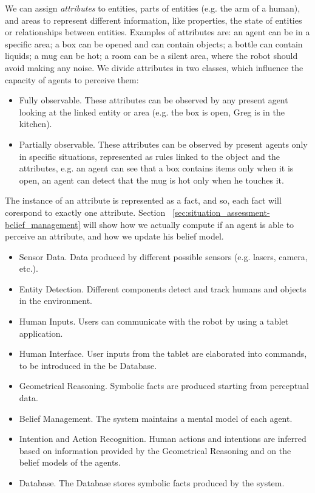 We can assign \textit{attributes} to entities, parts of entities (e.g. the arm of a human), and areas to represent different information, like properties, the state of entities or relationships between entities. Examples of attributes are:
an agent can be in a specific area; a box can be opened and can contain objects; a bottle can contain liquids; a mug can be hot; a room can be a silent area, where the robot should avoid making any noise.
We divide attributes in two classes, which influence the capacity of agents to perceive them: 
\begin{itemize}
\item Fully observable. These attributes can be observed by any present agent looking at the linked entity or area (e.g. the box is open, Greg is in the kitchen).
\item Partially observable. These attributes can be observed by present agents only in specific situations, represented as rules linked to the object and the attributes, e.g. an agent can see that a box contains items only when it is open, an agent can detect that the mug is hot only when he touches it. 
\end{itemize}

The instance of an attribute is represented as a fact, and so, each fact will corespond to exactly one attribute. Section ~\ref{sec:situation_assessment-belief_management} will show how we actually compute if an agent is able to perceive an attribute, and how we update his belief model. 


\begin{itemize}
\item Sensor Data. Data produced by different possible sensors (e.g. lasers, camera, etc.).
\item Entity Detection. Different components detect and track humans and objects in the environment.
\item Human Inputs. Users can communicate with the robot by using a tablet application.
\item Human Interface. User inputs from the tablet are elaborated into commands, to be introduced in the be Database.
\item Geometrical Reasoning. Symbolic facts are produced starting from perceptual data.
\item Belief Management. The system maintains a mental model of each agent.
\item Intention and Action Recognition. Human actions and intentions are inferred based on information provided by the Geometrical Reasoning and on the belief models of the agents.
\item Database. The Database stores symbolic facts produced by the system.
\end{itemize}


